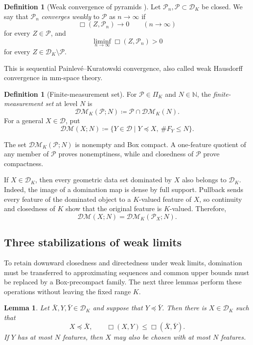 \documentclass[11pt]{amsart}
\theoremstyle{plain}
\newtheorem{lemma}[theorem]{Lemma}
\theoremstyle{definition}
\newtheorem{definition}[theorem]{Definition}
\theoremstyle{remark}
\newcommand{\D}{\mathcal D}
\newcommand{\DK}{\mathcal D_K}
\newcommand{\DM}{\mathcal{DM}}
\begin{document}
\begin{definition}[Weak convergence of pyramids {\cite[Definition~2.11]{gds1}}]
\label{def:weak-convergence}
Let $\mathcal P_n,\mathcal P\subset\DK$ be closed. We say that $\mathcal P_n$ \emph{converges weakly} to $\mathcal P$ as $n\to\infty$ if
\[
\Box(Z,\mathcal P_n)\longrightarrow0\qquad(n\to\infty)
\]
for every $Z\in\mathcal P$, and
\[
\liminf_{n\to\infty}\Box(Z,\mathcal P_n)>0
\]
for every $Z\in\DK\setminus\mathcal P$.
\end{definition}

This is sequential Painlev\'e--Kuratowski convergence, also called weak Hausdorff convergence in mm-space theory.

\begin{definition}[Finite-measurement set]
\label{def:finite-measurements}
For $\mathcal P\in\Pi_K$ and $N\in\mathbb N$, the \emph{finite-measurement set} at level $N$ is
\[
\DM_K(\mathcal P;N)\coloneqq\mathcal P\cap\DM_K(N).
\]
For a general $X\in\D$, put
\[
\DM(X;N)\coloneqq\{Y\in\D\mid Y\preceq X,\ \#F_Y\leq N\}.
\]
\end{definition}

The set $\DM_K(\mathcal P;N)$ is nonempty and Box compact. A one-feature quotient of any member of $\mathcal P$ proves nonemptiness, while  and closedness of $\mathcal P$ prove compactness.

If $X\in\DK$, then every geometric data set dominated by $X$ also belongs to $\DK$. Indeed, the image of a domination map is dense by full support. Pullback sends every feature of the dominated object to a $K$-valued feature of $X$, so continuity and closedness of $K$ show that the original feature is $K$-valued. Therefore,
\[
\DM(X;N)=\DM_K(\mathcal P_X;N).
\]

\subsection{Three stabilizations of weak limits}
\label{subsec:pyramid-weak-limits}

To retain downward closedness and directedness under weak limits, domination must be transferred to approximating sequences and common upper bounds must be replaced by a Box-precompact family. The next three lemmas perform these operations without leaving the fixed range $K$.

\begin{lemma}
\label{lem:K-domination-refinement}
Let $\bar X,Y,\bar Y\in\DK$ and suppose that $Y\preceq\bar Y$. Then there is $X\in\DK$ such that
\[
X\preceq\bar X,\qquad\Box(X,Y)\leq\Box(\bar X,\bar Y).
\]
If $Y$ has at most $N$ features, then $X$ may also be chosen with at most $N$ features.
\end{lemma}
\end{document}
